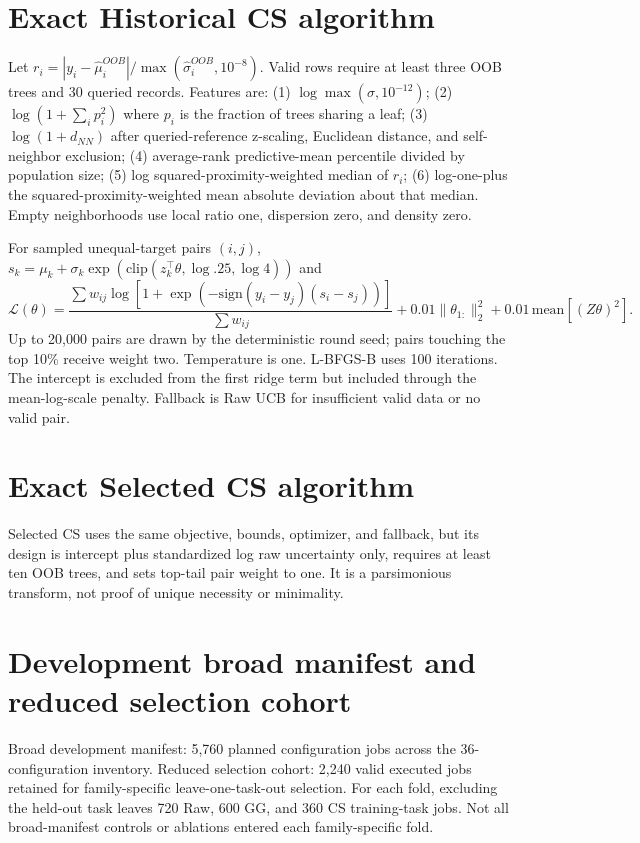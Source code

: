 \documentclass[9pt]{article}
\begin{document}
\section{Exact Historical CS algorithm}
Let $r_i=|y_i-\hat\mu_i^{OOB}|/\max(\hat\sigma_i^{OOB},10^{-8})$. Valid rows require at least three OOB trees and 30 queried records. Features are:
(1) $\log\max(\sigma,10^{-12})$;
(2) $\log(1+\sum_i p_i^2)$ where $p_i$ is the fraction of trees sharing a leaf;
(3) $\log(1+d_{NN})$ after queried-reference z-scaling, Euclidean distance, and self-neighbor exclusion;
(4) average-rank predictive-mean percentile divided by population size;
(5) log squared-proximity-weighted median of $r_i$;
(6) log-one-plus the squared-proximity-weighted mean absolute deviation about that median.
Empty neighborhoods use local ratio one, dispersion zero, and density zero.

For sampled unequal-target pairs $(i,j)$, $s_k=\mu_k+\sigma_k\exp(\mathrm{clip}(z_k^\top\theta,\log .25,\log4))$ and
\[
\mathcal L(\theta)=\frac{\sum w_{ij}\log[1+\exp(-\mathrm{sign}(y_i-y_j)(s_i-s_j))]}{\sum w_{ij}}
+0.01\|\theta_{1:}\|_2^2+0.01\,\mathrm{mean}[(Z\theta)^2].
\]
Up to 20,000 pairs are drawn by the deterministic round seed; pairs touching the top 10\% receive weight two. Temperature is one. L-BFGS-B uses 100 iterations. The intercept is excluded from the first ridge term but included through the mean-log-scale penalty. Fallback is Raw UCB for insufficient valid data or no valid pair.
\section{Exact Selected CS algorithm}
Selected CS uses the same objective, bounds, optimizer, and fallback, but its design is intercept plus standardized log raw uncertainty only, requires at least ten OOB trees, and sets top-tail pair weight to one. It is a parsimonious transform, not proof of unique necessity or minimality.
\section{Development broad manifest and reduced selection cohort}
Broad development manifest: 5,760 planned configuration jobs across the 36-configuration inventory. Reduced selection cohort: 2,240 valid executed jobs retained for family-specific leave-one-task-out selection. For each fold, excluding the held-out task leaves 720 Raw, 600 GG, and 360 CS training-task jobs. Not all broad-manifest controls or ablations entered each family-specific fold.
\end{document}
